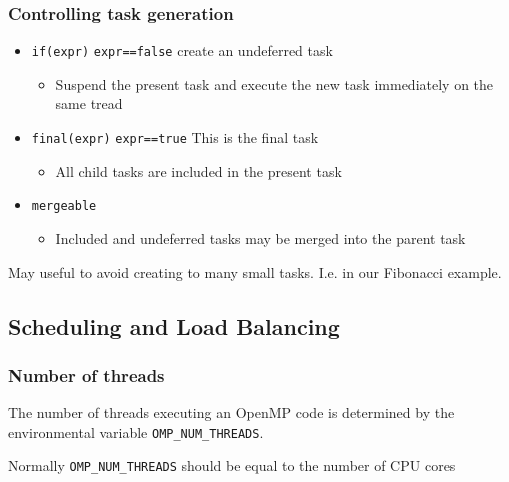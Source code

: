 \subsubsection{Controlling task
generation}\label{controlling-task-generation}

\begin{itemize}
\itemsep1pt\parskip0pt
\item
  \texttt{if(expr)} \texttt{expr==false} create an undeferred task

  \begin{itemize}
  \itemsep1pt\parskip0pt
  \item
    Suspend the present task and execute the new task immediately on the
    same tread
  \end{itemize}
\item
  \texttt{final(expr)} \texttt{expr==true} This is the final task

  \begin{itemize}
  \itemsep1pt\parskip0pt
  \item
    All child tasks are included in the present task
  \end{itemize}
\item
  \texttt{mergeable}

  \begin{itemize}
  \itemsep1pt\parskip0pt
  \item
    Included and undeferred tasks may be merged into the parent task
  \end{itemize}
\end{itemize}

May useful to avoid creating to many small tasks. I.e. in our Fibonacci
example.

\subsection{Scheduling and Load
Balancing}\label{scheduling-and-load-balancing}

\subsubsection{Number of threads}\label{number-of-threads}

The number of threads executing an OpenMP code is determined by the
environmental variable \texttt{OMP\_NUM\_THREADS}.

Normally \texttt{OMP\_NUM\_THREADS} should be equal to the number of CPU
cores


